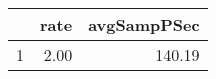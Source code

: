 \begin{table}[h]
\centering
\begingroup\tiny
\begin{tabular}{rrr}
  \hline
 & rate & avgSampPSec \\ 
  \hline
1 & 2.00 & 140.19 \\ 
   \hline
\end{tabular}
\endgroup
\end{table}
